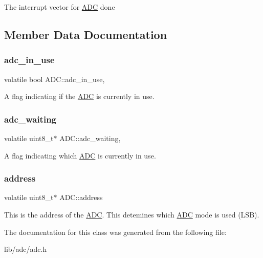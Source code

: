 The interrupt vector for \hyperlink{class_a_d_c}{A\+DC} done 

\subsection{Member Data Documentation}
\hypertarget{class_a_d_c_a13bcfd20fa1d5e80520e1485ac736afe}{}\label{class_a_d_c_a13bcfd20fa1d5e80520e1485ac736afe} 
\subsubsection{\texorpdfstring{adc\+\_\+in\+\_\+use}{adc\_in\_use}}
{\footnotesize\ttfamily volatile bool A\+D\+C\+::adc\+\_\+in\+\_\+use\hspace{0.3cm}{\ttfamily [static]}, {\ttfamily [private]}}

A flag indicating if the \hyperlink{class_a_d_c}{A\+DC} is currently in use. \hypertarget{class_a_d_c_a49c064d21c7bf460dc86c001db2747d9}{}\label{class_a_d_c_a49c064d21c7bf460dc86c001db2747d9} 
\subsubsection{\texorpdfstring{adc\+\_\+waiting}{adc\_waiting}}
{\footnotesize\ttfamily volatile uint8\+\_\+t$\ast$ A\+D\+C\+::adc\+\_\+waiting\hspace{0.3cm}{\ttfamily [static]}, {\ttfamily [private]}}

A flag indicating which \hyperlink{class_a_d_c}{A\+DC} is currently in use. \hypertarget{class_a_d_c_aa58c27581281db4bd8537df9ea2b49f2}{}\label{class_a_d_c_aa58c27581281db4bd8537df9ea2b49f2} 
\subsubsection{\texorpdfstring{address}{address}}
{\footnotesize\ttfamily volatile uint8\+\_\+t$\ast$ A\+D\+C\+::address\hspace{0.3cm}{\ttfamily [private]}}

This is the address of the \hyperlink{class_a_d_c}{A\+DC}. This detemines which \hyperlink{class_a_d_c}{A\+DC} mode is used (L\+SB). 

The documentation for this class was generated from the following file\+:\begin{DoxyCompactItemize}
\item 
lib/adc/adc.\+h\end{DoxyCompactItemize}

